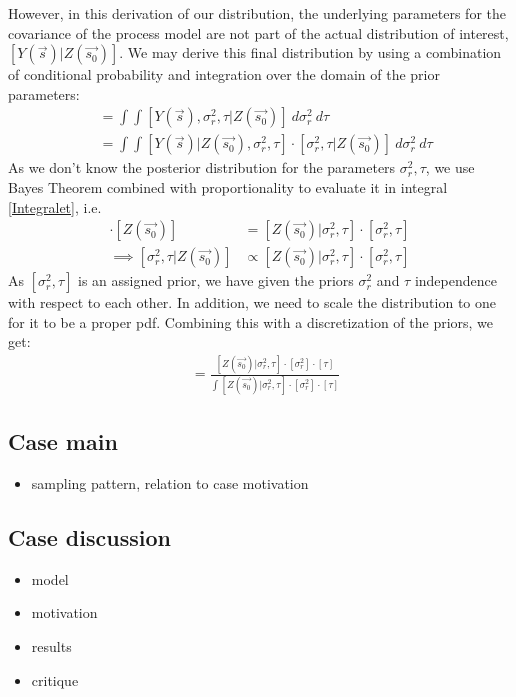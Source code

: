\documentclass{report}
\begin{document}
However, in this derivation of our distribution, the underlying parameters for the covariance of the process model are not part of the actual distribution of interest, $[Y(\vec{s}) | Z(\vec{s_0})]$. We may derive this final distribution by using a combination of conditional probability and integration over the domain of the prior parameters:
\begin{align*}
[Y(\vec{s}) | Z(\vec{s_0})] &= \int \int [Y(\vec{s}), \sigma_r^2, \tau | Z(\vec{s_0})] \ d\sigma_r^2 \ d\tau \\
&= \int \int [Y(\vec{s})| Z(\vec{s_0}), \sigma_r^2, \tau] \cdot [\sigma_r^2, \tau | Z(\vec{s_0})] \ d\sigma_r^2 \ d\tau
\end{align*}
As we don't know the posterior distribution for the parameters $\sigma_r^2, \tau$, we use Bayes Theorem combined with proportionality to evaluate it in integral \ref{Integralet}, i.e.
\begin{align*}
[\sigma_r^2, \tau | Z(\vec{s_0})] \cdot [Z(\vec{s_0})] &= [Z(\vec{s_0}) | \sigma_r^2, \tau] \cdot [\sigma_r^2, \tau] \\
\implies [\sigma_r^2, \tau | Z(\vec{s_0})] &\propto [Z(\vec{s_0}) | \sigma_r^2, \tau] \cdot [\sigma_r^2, \tau]
\end{align*}
As $[\sigma_r^2, \tau]$ is an assigned prior, we have given the priors $\sigma_r^2$ and $\tau$ independence with respect to each other. In addition, we need to scale the distribution to one for it to be a proper pdf. Combining this with a discretization of the priors, we get:
\begin{align*}
[\sigma_r^2, \tau | Z(\vec{s_0})] &= \frac{[Z(\vec{s_0}) | \sigma_r^2, \tau] \cdot [\sigma_r^2]\cdot [\tau]} {\int [Z(\vec{s_0}) | \sigma_r^2, \tau] \cdot [\sigma_r^2]\cdot [\tau] }
\end{align*}

\subsection{Case main}
\begin{itemize}
\item sampling pattern,  relation to case motivation
\end{itemize}
\subsection{Case discussion}
\begin{itemize}
\item model
\item motivation
\item results
\item critique
\end{itemize}
\end{document}
